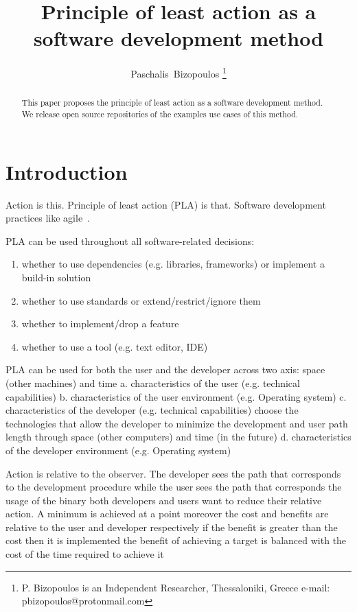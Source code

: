 \documentclass[journal]{IEEEtran}
\begin{document}
\title{Principle of least action as a software development method}

\author{Paschalis~Bizopoulos
\thanks{P. Bizopoulos is an Independent Researcher, Thessaloniki, Greece e-mail: pbizopoulos@protonmail.com}}

\maketitle

\begin{abstract}
	This paper proposes the principle of least action as a software development method.
	We release open source repositories of the examples use cases of this method.
\end{abstract}

\section{Introduction}
Action is this.
Principle of least action (PLA) is that.
Software development practices like agile~\cite{abrahamsson2017agile}.

PLA can be used throughout all software-related decisions:
\begin{enumerate}
	\item whether to use dependencies (e.g. libraries, frameworks) or implement a build-in solution
	\item whether to use standards or extend/restrict/ignore them
	\item whether to implement/drop a feature
	\item whether to use a tool (e.g. text editor, IDE)
\end{enumerate}

PLA can be used for both the user and the developer across two axis: space (other machines) and time
a. characteristics of the user (e.g. technical capabilities)
b. characteristics of the user environment (e.g. Operating system)
c. characteristics of the developer (e.g. technical capabilities)
choose the technologies that allow the developer to minimize the development and user path length through space (other computers) and time (in the future)
d. characteristics of the developer environment (e.g. Operating system)

Action is relative to the observer.
The developer sees the path that corresponds to the development procedure while the user sees the path that corresponds the usage of the binary
both developers and users want to reduce their relative action. A minimum is achieved at a point
moreover the cost and benefits are relative to the user and developer respectively
if the benefit is greater than the cost then it is implemented
the benefit of achieving a target is balanced with the cost of the time required to achieve it
\end{document}
